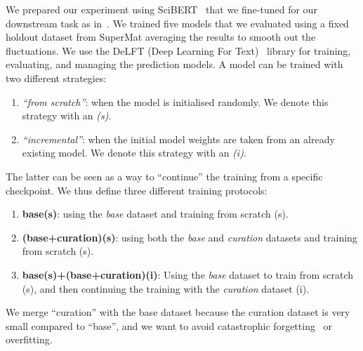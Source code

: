 We prepared our experiment using SciBERT~\cite{Beltagy2019SciBERT} that we fine-tuned for our downstream task as in~\cite{foppiano2023automatic}. 
We trained five models that we evaluated using a fixed holdout dataset from SuperMat averaging the results to smooth out the fluctuations. 
We use the DeLFT (Deep Learning For Text)~\cite{DeLFT} library for training, evaluating, and managing the prediction models.  
A model can be trained with two different strategies: 
\begin{enumerate}
    \item \emph{``from scratch''}: when the model is initialised randomly. We denote this strategy with an \emph{(s)}.
    \item \emph{``incremental''}: when the initial model weights are taken from an already existing model. We denote this strategy with an \emph{(i)}.
\end{enumerate}
The latter can be seen as a way to ``continue'' the training from a specific checkpoint.
We thus define three different training protocols: 
\begin{enumerate}
    \item \textbf{base(s)}: using the \emph{base} dataset and training from scratch (s).
    \item \textbf{(base+curation)(s)}: using both the \emph{base} and \emph{curation} datasets and training from scratch (s).
    \item \textbf{base(s)+(base+curation)(i)}: Using the \emph{base} dataset to train from scratch (s), and then continuing the training with the \emph{curation} dataset (i).
\end{enumerate}
We merge ``curation'' with the base dataset because the curation dataset is very small compared to ``base'', and we want to avoid catastrophic forgetting~\cite{overcoming-kirkpatrick-etal-2016} or overfitting.

